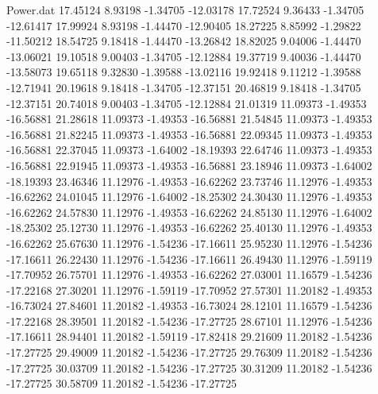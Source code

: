 \begin{filecontents}{Power.dat}
  17.45124    8.93198   -1.34705  -12.03178
  17.72524    9.36433   -1.34705  -12.61417
  17.99924    8.93198   -1.44470  -12.90405
  18.27225    8.85992   -1.29822  -11.50212
  18.54725    9.18418   -1.44470  -13.26842
  18.82025    9.04006   -1.44470  -13.06021
  19.10518    9.00403   -1.34705  -12.12884
  19.37719    9.40036   -1.44470  -13.58073
  19.65118    9.32830   -1.39588  -13.02116
  19.92418    9.11212   -1.39588  -12.71941
  20.19618    9.18418   -1.34705  -12.37151
  20.46819    9.18418   -1.34705  -12.37151
  20.74018    9.00403   -1.34705  -12.12884
  21.01319   11.09373   -1.49353  -16.56881
  21.28618   11.09373   -1.49353  -16.56881
  21.54845   11.09373   -1.49353  -16.56881
  21.82245   11.09373   -1.49353  -16.56881
  22.09345   11.09373   -1.49353  -16.56881
  22.37045   11.09373   -1.64002  -18.19393
  22.64746   11.09373   -1.49353  -16.56881
  22.91945   11.09373   -1.49353  -16.56881
  23.18946   11.09373   -1.64002  -18.19393
  23.46346   11.12976   -1.49353  -16.62262
  23.73746   11.12976   -1.49353  -16.62262
  24.01045   11.12976   -1.64002  -18.25302
  24.30430   11.12976   -1.49353  -16.62262
  24.57830   11.12976   -1.49353  -16.62262
  24.85130   11.12976   -1.64002  -18.25302
  25.12730   11.12976   -1.49353  -16.62262
  25.40130   11.12976   -1.49353  -16.62262
  25.67630   11.12976   -1.54236  -17.16611
  25.95230   11.12976   -1.54236  -17.16611
  26.22430   11.12976   -1.54236  -17.16611
  26.49430   11.12976   -1.59119  -17.70952
  26.75701   11.12976   -1.49353  -16.62262
  27.03001   11.16579   -1.54236  -17.22168
  27.30201   11.12976   -1.59119  -17.70952
  27.57301   11.20182   -1.49353  -16.73024
  27.84601   11.20182   -1.49353  -16.73024
  28.12101   11.16579   -1.54236  -17.22168
  28.39501   11.20182   -1.54236  -17.27725
  28.67101   11.12976   -1.54236  -17.16611
  28.94401   11.20182   -1.59119  -17.82418
  29.21609   11.20182   -1.54236  -17.27725
  29.49009   11.20182   -1.54236  -17.27725
  29.76309   11.20182   -1.54236  -17.27725
  30.03709   11.20182   -1.54236  -17.27725
  30.31209   11.20182   -1.54236  -17.27725
  30.58709   11.20182   -1.54236  -17.27725
\end{filecontents}
